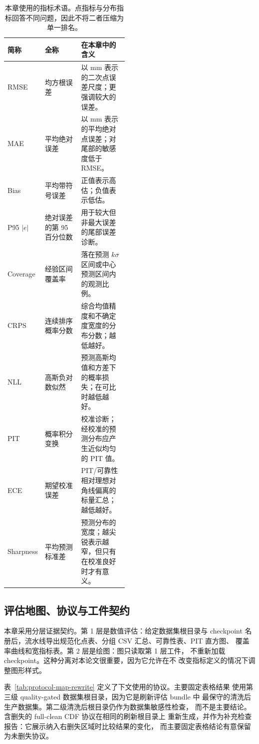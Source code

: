 \begin{table}[t]
\centering
\footnotesize
\setlength{\tabcolsep}{4pt}
\begin{tabularx}{\linewidth}{@{}L{0.18\linewidth}L{0.30\linewidth}Y@{}}
\toprule
简称 & 全称 & 在本章中的含义 \\
\midrule
RMSE & 均方根误差 & 以 mm 表示的二次点误差尺度；更强调较大的误差。 \\
MAE & 平均绝对误差 & 以 mm 表示的平均绝对点误差；对尾部的敏感度低于 RMSE。 \\
Bias & 平均带符号误差 & 正值表示高估；负值表示低估。 \\
P95 \(|e|\) & 绝对误差的第 95 百分位数 & 用于较大但非最大误差的尾部误差诊断。 \\
Coverage & 经验区间覆盖率 & 落在预测 \(k\sigma\) 区间或中心预测区间内的观测比例。 \\
CRPS & 连续排序概率分数 & 综合均值精度和不确定度宽度的分布分数；越低越好。 \\
NLL & 高斯负对数似然 & 预测高斯均值和方差下的概率损失；在可比时越低越好。 \\
PIT & 概率积分变换 & 校准诊断；经校准的预测分布应产生近似均匀的 PIT 值。 \\
ECE & 期望校准误差 & PIT/可靠性相对理想对角线偏离的标量汇总；越低越好。 \\
Sharpness & 平均预测标准差 & 预测分布的宽度；越尖锐表示越窄，但只有在校准良好时才有意义。 \\
\bottomrule
\end{tabularx}
\caption{本章使用的指标术语。点指标与分布指标回答不同问题，因此不将二者压缩为单一排名。}
\label{tab:metric-vocabulary-rewrite}
\end{table}

\subsection{评估地图、协议与工件契约}
\label{sec:results-map-protocols}

本章采用分层证据契约。第 1 层是数值评估：给定数据集根目录与 checkpoint
名册后，流水线导出规范化点表、分组 CSV 汇总、可靠性表、PIT 直方图、
覆盖率曲线和宽指标表。第 2 层是绘图：图只读取第 1 层工件，
不重新加载 checkpoint。这种分离对本论文很重要，因为它允许在不
改变指标定义的情况下调整图形样式。

表~\ref{tab:protocol-map-rewrite} 定义了下文使用的协议。主要固定表格结果
使用第三级 quality-gated 数据集根目录，因为它是刷新评估 bundle 中
最保守的清洗后生产数据集。第二级清洗后根目录仍作为数据集敏感性检查，
而不是主要结论。含删失的 full-clean CDF 协议在相同的刷新根目录上
重新生成，并作为补充检查报告：它展示纳入右删失区域时比较结果的变化，
而主要固定表格结论有意保留为未删失协议。

